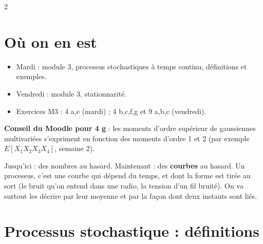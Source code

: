 \documentclass[a4paper,9pt]{extarticle}
\begin{document}

\thispagestyle{fancy}



\begin{multicols}{2}


\section{Où on en est}


\begin{summary}

\begin{itemize}

\item Mardi : module 3, processus stochastiques à temps continu, définitions et exemples.

\item Vendredi : module 3, stationnarité.

\item Exercices M3 : 4 a,e (mardi) ; 4 b,c,f,g et 9 a,b,c (vendredi).

\end{itemize}

\end{summary}


\begin{important}

\textbf{Conseil du Moodle pour 4 g} : les moments d'ordre supérieur de gaussiennes multivariées
s'expriment en fonction des moments d'ordre 1 et 2 (par exemple $E[X_1X_2X_3X_4]$, semaine 2).

\end{important}


\begin{simple}

Jusqu'ici : des nombres au hasard. Maintenant : des \textbf{courbes} au hasard. Un processus,
c'est une courbe qui dépend du temps, et dont la forme est tirée au sort (le bruit qu'on entend
dans une radio, la tension d'un fil bruité). On va surtout les décrire par leur moyenne et par
la façon dont deux instants sont liés.

\end{simple}


\section{Processus stochastique : définitions}



\end{multicols}
\end{document}
